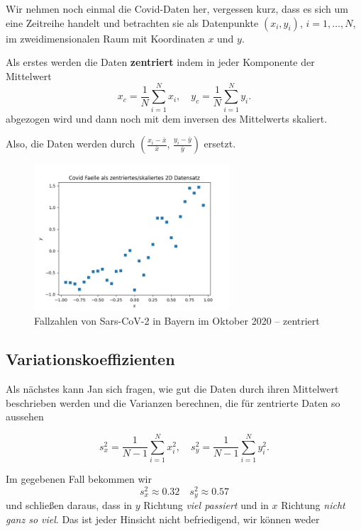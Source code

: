 \documentclass[
]{book}
\theoremstyle{definition}
\theoremstyle{definition}
\theoremstyle{definition}
\theoremstyle{definition}
\theoremstyle{remark}
\begin{document}
Wir nehmen noch einmal die Covid-Daten her, vergessen kurz, dass es sich um eine Zeitreihe handelt und betrachten sie als Datenpunkte \((x_i, y_i)\), \(i=1,\dotsc,N\), im zweidimensionalen Raum mit Koordinaten \(x\) und \(y\).

Als erstes werden die Daten \textbf{zentriert} indem in jeder Komponente der Mittelwert
\begin{equation*}
x_c = \frac 1N \sum_{i=1}^N x_i,
\quad
y_c = \frac 1N \sum_{i=1}^N y_i.
\end{equation*}
abgezogen wird und dann noch mit dem inversen des Mittelwerts skaliert.

Also, die Daten werden durch \((\frac{x_i-\bar x}{\bar x},\, \frac{y_i-\bar y}{\bar y})\) ersetzt.

\begin{figure}
\hypertarget{fig:cases-cntrd}{%
\centering
\includegraphics[width=0.65\textwidth,height=\textheight]{bilder/07-covid-cntrd.png}
\caption{Fallzahlen von Sars-CoV-2 in Bayern im Oktober
2020 -- zentriert}\label{fig:cases-cntrd}
}
\end{figure}

\hypertarget{variationskoeffizienten}{%
\subsection{Variationskoeffizienten}\label{variationskoeffizienten}}

Als nächstes kann Jan sich fragen, wie gut die Daten durch ihren Mittelwert beschrieben werden und die Varianzen berechnen, die für zentrierte Daten so aussehen

\begin{equation*}
s_x^2 = \frac {1}{N-1} \sum_{i=1}^N x_i^2,
\quad
s_y^2 = \frac {1}{N-1} \sum_{i=1}^N y_i^2.
\end{equation*}

Im gegebenen Fall bekommen wir
\begin{equation*}
s_x^2 \approx 0.32
\quad
s_y^2 \approx  0.57
\end{equation*}
und schließen daraus, dass in \(y\) Richtung \emph{viel passiert} und in \(x\) Richtung \emph{nicht ganz so viel}. Das ist jeder Hinsicht nicht befriedigend, wir können weder
\end{document}
